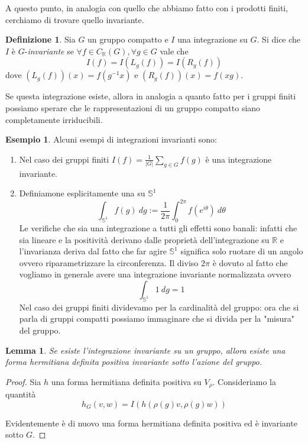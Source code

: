 \documentclass[11pt]{article}
\theoremstyle{plain}
\newtheorem{lemma}[thm]{Lemma}
\theoremstyle{definition}
\newtheorem{defn}{Definizione}[section]
\newtheorem{exmp}{Esempio}[section]
\theoremstyle{remark}
\newcommand{\R}{\mathbb{R}}
\newcommand{\dint}{\displaystyle\int}
\begin{document}
A questo punto, in analogia con quello che abbiamo fatto con i prodotti finiti, cerchiamo di trovare quello invariante. 

\begin{defn} Sia $G$ un gruppo compatto e $I$ una integrazione su $G$. Si dice che $I$ è $G$-\textit{invariante} se $\forall f\in C_{\R}(G), \forall g\in G$ vale che
\[ I(f) = I(L_g(f)) = I(R_g(f))\]
dove $(L_g(f))(x) = f(g^{-1}x)$ e $(R_g(f))(x) = f(xg)$.
\end{defn}
Se questa integrazione esiste, allora in analogia a quanto fatto per i gruppi finiti possiamo sperare che le rappresentazioni di un gruppo compatto siano completamente irriducibili.


\begin{exmp}Alcuni esempi di integrazioni invarianti sono:
	\begin{enumerate}
		\item Nel caso dei gruppi finiti $I(f)=\frac{1}{|G|}\sum_{g\in G}f(g)$ è una integrazione invariante.
		\item Definiamone esplicitamente una su $\mathbb{S}^1$ 
		\[\dint_{\mathbb{S}^1}f(g)\ dg:=\frac{1}{2\pi}\dint_0^{2\pi}f(e^{i\theta})\ d\theta\]
		Le verifiche che sia una integrazione a tutti gli effetti sono banali: infatti che sia lineare e la positività derivano dalle proprietà dell'integrazione su $\R$ e l'invarianza deriva dal fatto che far agire $\mathbb{S}^1$ significa solo ruotare di un angolo ovvero riparametrizzare la circonferenza.
		Il diviso $2\pi$ è dovuto al fatto che vogliamo in generale avere una integrazione invariante normalizzata ovvero
		\[\dint_{\mathbb{S}^1}1\ dg=1\]
		Nel caso dei gruppi finiti dividevamo per la cardinalità del gruppo: ora che si parla di gruppi compatti possiamo immaginare che si divida per la "misura" del gruppo. 
	\end{enumerate}
\end{exmp}

\begin{lemma}
  Se esiste l'integrazione invariante su un gruppo, allora esiste una forma hermitiana definita positiva invariante sotto l'azione del gruppo.
\end{lemma}
\begin{proof}
  Sia $h$ una forma hermitiana definita positiva su $V_\rho$. Consideriamo la quantità
  \[ h_G(v,w) = I( h(\rho(g) v, \rho(g) w)) \]

  Evidentemente è di nuovo una forma hermitiana definita positiva ed è invariante sotto $G$.


\end{proof}
\end{document}
